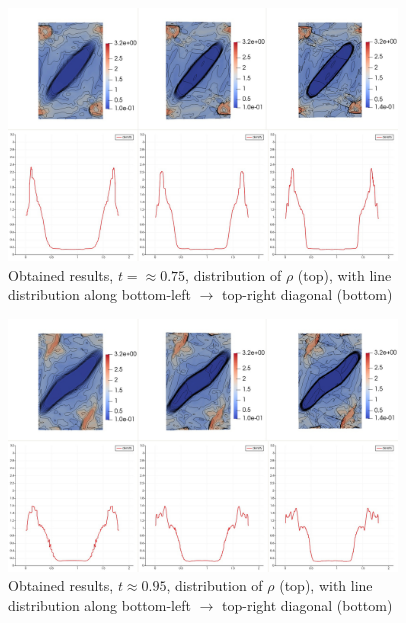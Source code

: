 \begin{figure}[H]
	\begin{center}
		\includegraphics[width=0.92\textwidth]{img/mhd-blast/new/blast,1noadapt14.jpg}
	\caption{Obtained results, $t = \approx 0.75$, distribution of $\rho$ (top), with line distribution along bottom-left $\rightarrow$ top-right diagonal (bottom)}
	\label{figure:blastNew15}
	\end{center}
\end{figure}
\vspace{-8mm}

\begin{figure}[H]
	\begin{center}
		\includegraphics[width=0.92\textwidth]{img/mhd-blast/new/blast,1noadapt18.jpg}
	\caption{Obtained results, $t \approx 0.95$, distribution of $\rho$ (top), with line distribution along bottom-left $\rightarrow$ top-right diagonal (bottom)}
	\label{figure:blastNew16}
	\end{center}
\end{figure}
\vspace{-4mm}

